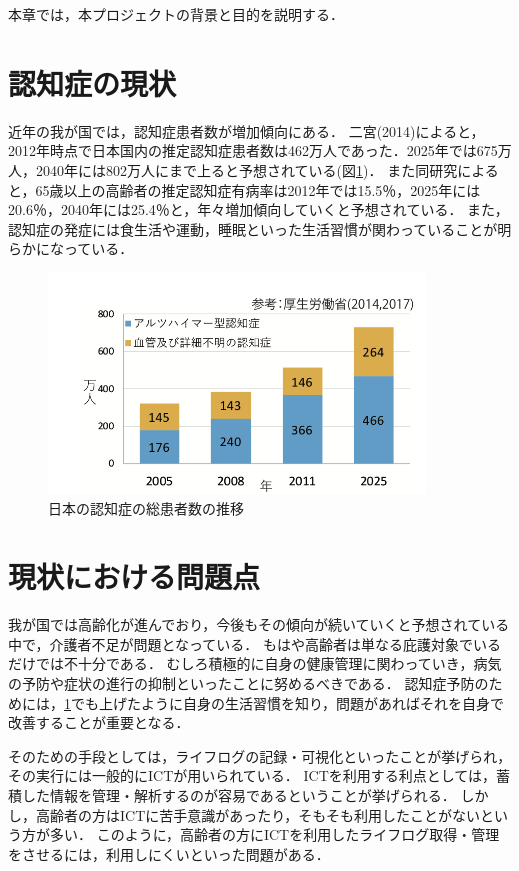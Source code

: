 \documentclass[../report]{subfiles}
\begin{document}
本章では，本プロジェクトの背景と目的を説明する．

\section{認知症の現状} \label{sec:genzyou}
近年の我が国では，認知症患者数が増加傾向にある．
二宮(2014)によると，2012年時点で日本国内の推定認知症患者数は462万人であった\cite{syourai}．2025年では675万人，2040年には802万人にまで上ると予想されている(図\ref{fig:ninchisyo-graph})．
また同研究によると，65歳以上の高齢者の推定認知症有病率は2012年では15.5％，2025年には20.6％，2040年には25.4％と，年々増加傾向していくと予想されている\cite{syourai}．
また，認知症の発症には食生活や運動，睡眠といった生活習慣が関わっていることが明らかになっている\cite{seikatsu}．
\begin{figure}[htbp]
    \begin{center}
        \includegraphics[width=10cm]{imgs/ninchisyo-graph.png}
        \caption{日本の認知症の総患者数の推移}
        \label{fig:ninchisyo-graph}
    \end{center}
\end{figure}

\section{現状における問題点} \label{sec:mondai}
我が国では高齢化が進んでおり，今後もその傾向が続いていくと予想されている中で，介護者不足が問題となっている．
もはや高齢者は単なる庇護対象でいるだけでは不十分である\cite{kaigo}．
むしろ積極的に自身の健康管理に関わっていき，病気の予防や症状の進行の抑制といったことに努めるべきである．
認知症予防のためには，\ref{sec:genzyou}でも上げたように自身の生活習慣を知り，問題があればそれを自身で改善することが重要となる．

そのための手段としては，ライフログの記録・可視化といったことが挙げられ\cite{lifelog}， その実行には一般的にICTが用いられている．
ICTを利用する利点としては，蓄積した情報を管理・解析するのが容易であるということが挙げられる．
しかし，高齢者の方はICTに苦手意識があったり，そもそも利用したことがないという方が多い．
このように，高齢者の方にICTを利用したライフログ取得・管理をさせるには，利用しにくいといった問題がある．
\end{document}
